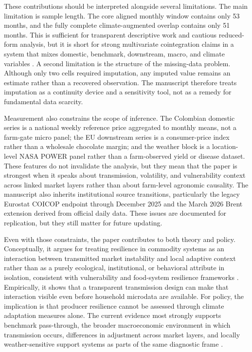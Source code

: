 \documentclass[11pt]{article}
\begin{document}
These contributions should be interpreted alongside several limitations. The main limitation is sample length. The core aligned monthly window contains only 53 months, and the fully complete climate-augmented overlap contains only 51 months. This is sufficient for transparent descriptive work and cautious reduced-form analysis, but it is short for strong multivariate cointegration claims in a system that mixes domestic, benchmark, downstream, macro, and climate variables \citep{hakkio_rush_1991}. A second limitation is the structure of the missing-data problem. Although only two cells required imputation, any imputed value remains an estimate rather than a recovered observation. The manuscript therefore treats imputation as a continuity device and a sensitivity tool, not as a remedy for fundamental data scarcity.

Measurement also constrains the scope of inference. The Colombian domestic series is a national weekly reference price aggregated to monthly means, not a farm-gate micro panel; the EU downstream series is a consumer-price index rather than a wholesale chocolate margin; and the weather block is a location-level NASA POWER panel rather than a farm-observed yield or disease dataset. These features do not invalidate the analysis, but they mean that the paper is strongest when it speaks about transmission, volatility, and vulnerability context across linked market layers rather than about farm-level agronomic causality. The manuscript also inherits institutional source transitions, particularly the legacy Eurostat COICOP endpoint through December 2025 and the March 2026 Brent extension derived from official daily data. These issues are documented for replication, but they still matter for future updating.

Even with those constraints, the paper contributes to both theory and policy. Conceptually, it argues for treating resilience in commodity systems as an interaction between transmitted market instability and local adaptive context rather than as a purely ecological, institutional, or behavioral attribute in isolation, consistent with vulnerability and food-system resilience frameworks \citep{Turner2003,Adger2006,Zurek2022}. Empirically, it shows that a transparent transmission design can make that interaction visible even before household microdata are available. For policy, the implication is that producer resilience cannot be assessed through climate adaptation measures alone. The current evidence most strongly supports benchmark pass-through, the broader macroeconomic environment in which transmission occurs, differences in adjustment across market layers, and locally weather-sensitive support systems as parts of the same diagnostic frame \citep{Gereffi2005,Merkle2021}.
\end{document}
